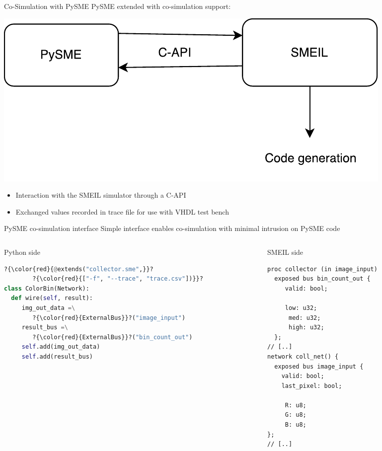 \documentclass{beamer}
\begin{document}
\begin{frame}{Co-Simulation with PySME}
  PySME extended with co-simulation support:

  \includegraphics[width=\textwidth]{co-simulation.pdf}
  \begin{itemize}
  \item Interaction with the SMEIL simulator through a C-API
  \item Exchanged values recorded in trace file for use with VHDL test bench
\end{itemize}
\end{frame}

\begin{frame}[fragile]{PySME co-simulation interface}
  Simple interface enables co-simulation with minimal intrusion on PySME code

  \begin{columns}
    \begin{column}[T]{0.5\textwidth}
      \centering
      Python side
\begin{lstlisting}[language=python]
?{\color{red}{@extends("collector.sme",}}?
        ?{\color{red}{["-f", "--trace", "trace.csv"])}}?
class ColorBin(Network):
  def wire(self, result):
     img_out_data =\
        ?{\color{red}{ExternalBus}}?("image_input")
     result_bus =\
        ?{\color{red}{ExternalBus}}?("bin_count_out")
     self.add(img_out_data)
     self.add(result_bus)
\end{lstlisting}
    \end{column}
    \begin{column}[T]{0.5\textwidth}
      \centering
      SMEIL side
      \begin{lstlisting}[language=smeil]
proc collector (in image_input)
  exposed bus bin_count_out {
     valid: bool;

     low: u32;
      med: u32;
      high: u32;
  };
// [..]
network coll_net() {
  exposed bus image_input {
    valid: bool;
    last_pixel: bool;

     R: u8;
     G: u8;
     B: u8;
};
// [..]
\end{lstlisting}
    \end{column}
  \end{columns}
\end{frame}
\end{document}
